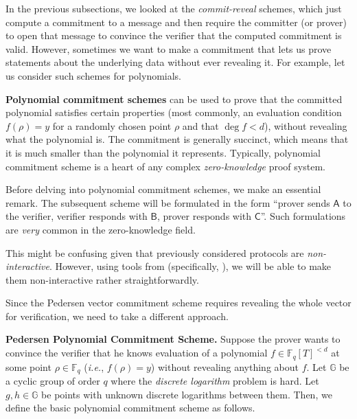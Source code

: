 \documentclass[../../book]{subfiles}
\begin{document}
In the previous subsections, we looked at the \emph{commit-reveal} schemes, which just compute a commitment to a message and then require the committer (or prover) to open that message to convince the verifier that the computed commitment is valid. However, sometimes we want to make a commitment that lets us prove statements about the underlying data without ever revealing it. For example, let us consider such schemes for polynomials.

\textbf{Polynomial commitment schemes} can be used to prove that the committed polynomial satisfies certain properties (most commonly, an evaluation condition $f(\rho) = y$ for a randomly chosen point $\rho$ and that $\deg f < d$), without revealing what the polynomial is.
The commitment is generally succinct, which means that it is much smaller than the polynomial it represents. Typically, polynomial commitment scheme is a heart of any complex \textit{zero-knowledge} proof system.

\begin{remark}
    Before delving into polynomial commitment schemes, we make an essential remark.
    The subsequent scheme will be formulated in the form ``prover sends $\mathsf{A}$ to the verifier, verifier responds with $\mathsf{B}$, prover responds with $\mathsf{C}$''.
    Such formulations are \emph{very} common in the zero-knowledge field.

    This might be confusing given that previously considered protocols are \emph{non-interactive}.
    However, using tools from  (specifically, ), we will be able to make them non-interactive rather straightforwardly.
\end{remark}

Since the Pedersen vector commitment scheme requires revealing the whole vector for verification, we need to take a different approach.

\textbf{Pedersen Polynomial Commitment Scheme.} Suppose the prover wants to convince the verifier that he knows evaluation of a polynomial $f \in \mathbb{F}_{q}[T]^{<d}$ at some point $\rho \in \mathbb{F}_q$ (\textit{i.e.}, $f(\rho) = y$) without revealing anything about $f$. Let $\mathbb{G}$ be a cyclic group of order $q$ where the \textit{discrete logarithm} problem is hard. 
Let $g,h \in \mathbb{G}$ be points with unknown discrete logarithms between them. Then, we define the basic polynomial commitment scheme as follows.
\end{document}
